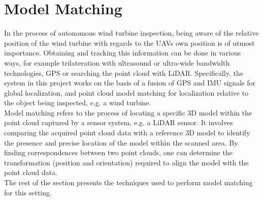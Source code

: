 \section{Model Matching} \label{sec:model_matching}

In the process of autonomous wind turbine inspection, being aware of the relative position of the wind turbine with regards to the UAVs own position is of utmost importance. Obtaining and tracking this information can be done in various ways, for example trilateration with ultrasound or ultra-wide bandwidth technologies, GPS or searching the point cloud with LiDAR. Specifically, the system in this project works on the basis of a fusion of GPS and IMU signals for global localization, and point cloud model matching for localization relative to the object being inspected, e.g. a wind turbine.\\
Model matching refers to the process of locating a specific 3D model within the point cloud captured by a sensor system, e.g. a LiDAR sensor. It involves comparing the acquired point cloud data with a reference 3D model to identify the presence and precise location of the model within the scanned area. By finding correspondences between two point clouds, one can determine the transformation (position and orientation) required to align the model with the point cloud data.\\
The rest of the section presents the techniques used to perform model matching for this setting.


